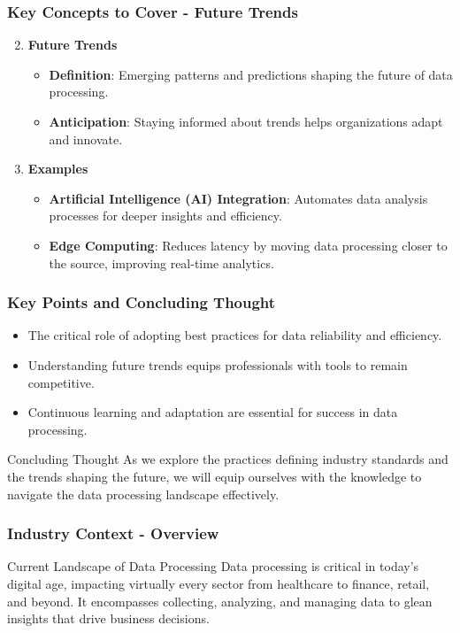 \documentclass{beamer}
\begin{document}
\begin{frame}[fragile]
    \frametitle{Key Concepts to Cover - Future Trends}
    \begin{enumerate}
        \setcounter{enumi}{1}
        \item \textbf{Future Trends}
        \begin{itemize}
            \item \textbf{Definition}: Emerging patterns and predictions shaping the future of data processing.
            \item \textbf{Anticipation}: Staying informed about trends helps organizations adapt and innovate.
        \end{itemize}
        \item \textbf{Examples}
        \begin{itemize}
            \item \textbf{Artificial Intelligence (AI) Integration}: Automates data analysis processes for deeper insights and efficiency.
            \item \textbf{Edge Computing}: Reduces latency by moving data processing closer to the source, improving real-time analytics.
        \end{itemize}
    \end{enumerate}
\end{frame}

\begin{frame}[fragile]
    \frametitle{Key Points and Concluding Thought}
    \begin{itemize}
        \item The critical role of adopting best practices for data reliability and efficiency.
        \item Understanding future trends equips professionals with tools to remain competitive.
        \item Continuous learning and adaptation are essential for success in data processing.
    \end{itemize}

    \begin{block}{Concluding Thought}
        As we explore the practices defining industry standards and the trends shaping the future, we will equip ourselves with the knowledge to navigate the data processing landscape effectively.
    \end{block}
\end{frame}

\begin{frame}[fragile]
    \frametitle{Industry Context - Overview}
    \begin{block}{Current Landscape of Data Processing}
        Data processing is critical in today’s digital age, impacting virtually every sector from healthcare to finance, retail, and beyond. It encompasses collecting, analyzing, and managing data to glean insights that drive business decisions.
    \end{block}
\end{frame}
\end{document}

